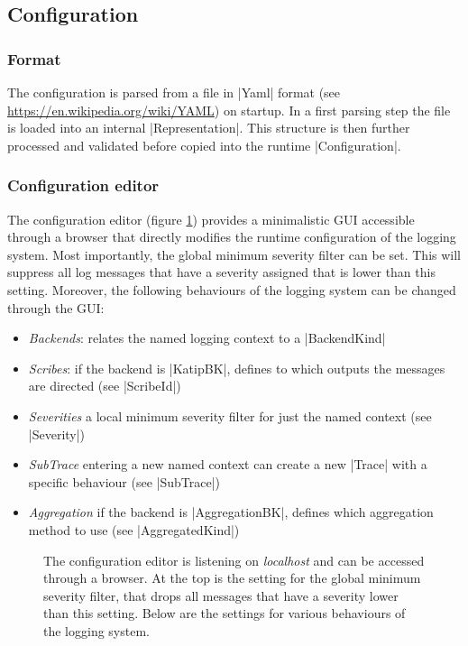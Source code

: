 

\subsection{Configuration}\label{sec:configuration}

\subsubsection{Format}

The configuration is parsed from a file in |Yaml| format (see \url{https://en.wikipedia.org/wiki/YAML})
on startup.
In a first parsing step the file is loaded into an internal |Representation|. This structure is then
further processed and validated before copied into the runtime |Configuration|.

\subsubsection{Configuration editor}

The configuration editor (figure \ref{fig:configeditor}) provides a minimalistic GUI accessible through a browser
that directly modifies the runtime configuration of the logging system.
Most importantly, the global minimum severity filter can be set. This will suppress all log messages that have
a severity assigned that is lower than this setting.
Moreover, the following behaviours of the logging system can be changed through the GUI:

\begin{itemize}
    \item \emph{Backends}: relates the named logging context to a |BackendKind|
    \item \emph{Scribes}: if the backend is |KatipBK|, defines to which outputs the messages are directed (see |ScribeId|)
    \item \emph{Severities} a local minimum severity filter for just the named context (see |Severity|)
    \item \emph{SubTrace} entering a new named context can create a new |Trace| with a specific behaviour (see |SubTrace|)
    \item \emph{Aggregation} if the backend is |AggregationBK|, defines which aggregation method to use (see |AggregatedKind|)

\end{itemize}

\begin{figure}[ht]
    \caption{The configuration editor is listening on \emph{localhost} and can be accessed through a browser.
    At the top is the setting for the global minimum severity filter, that drops all messages that have a
    severity lower than this setting. Below are the settings for various behaviours of the logging system.
    }\label{fig:configeditor}
    \end{figure}
    
